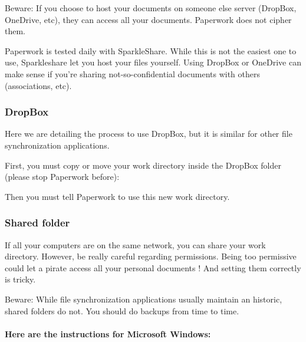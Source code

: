 \documentclass[10pt,a4paper]{article}
\begin{document}
Beware: If you choose to host your documents on someone else server
(DropBox, OneDrive, etc), they can access all your documents. Paperwork
does not cipher them.

Paperwork is tested daily with SparkleShare. While this is not the
easiest one to use, Sparkleshare let you host your files yourself.
Using DropBox or OneDrive can make sense if you're sharing not-so-confidential
documents with others (associations, etc).

\subsubsection{DropBox}

Here we are detailing the process to use DropBox, but it is similar
for other file synchronization applications.

First, you must copy or move your work directory inside the DropBox
folder (please stop Paperwork before):


Then you must tell Paperwork to use this new work directory.

\subsubsection{Shared folder}

If all your computers are on the same network, you can share your
work directory. However, be really careful regarding permissions.
Being too permissive could let a pirate access all your personal documents
! And setting them correctly is tricky.

Beware: While file synchronization applications usually maintain an
historic, shared folders do not. You should do backups from time to
time.

\paragraph{Here are the instructions for Microsoft Windows:}
\end{document}
